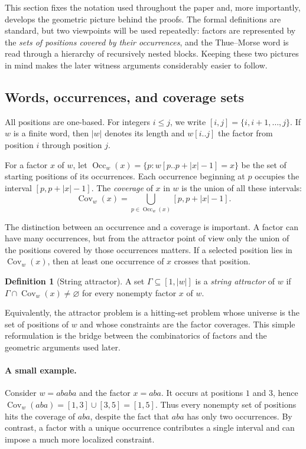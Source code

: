 \documentclass[11pt,a4paper]{article}
\theoremstyle{definition}\newtheorem{definition}[theorem]{Definition}
\theoremstyle{remark}\newtheorem{remark}[theorem]{Remark}
\newcommand{\Occ}{\operatorname{Occ}}
\newcommand{\Cov}{\operatorname{Cov}}
\begin{document}
This section fixes the notation used throughout the paper and, more importantly, develops the geometric picture behind the proofs. The formal definitions are standard, but two viewpoints will be used repeatedly: factors are represented by the \emph{sets of positions covered by their occurrences}, and the Thue--Morse word is read through a hierarchy of recursively nested blocks. Keeping these two pictures in mind makes the later witness arguments considerably easier to follow.

\subsection{Words, occurrences, and coverage sets}
All positions are one-based. For integers $i\le j$, we write
$
[i,j]=\{i,i+1,\ldots,j\}.
$
If $w$ is a finite word, then $|w|$ denotes its length and $w[i..j]$ the factor from position $i$ through position $j$.

For a factor $x$ of $w$, let
$
\Occ_w(x)=\{p:w[p..p+|x|-1]=x\}
$
be the set of starting positions of its occurrences. Each occurrence beginning at $p$ occupies the interval
$
[p,p+|x|-1].
$
The \emph{coverage} of $x$ in $w$ is the union of all these intervals:
\begin{equation}
\Cov_w(x)=\bigcup_{p\in\Occ_w(x)}[p,p+|x|-1].
\label{eq:coverage-definition}
\end{equation}

The distinction between an occurrence and a coverage is important. A factor can have many occurrences, but from the attractor point of view only the union of the positions covered by those occurrences matters. If a selected position lies in $\Cov_w(x)$, then at least one occurrence of $x$ crosses that position.

\begin{definition}[String attractor]
A set $\Gamma\subseteq[1,|w|]$ is a \emph{string attractor} of $w$ if
$
\Gamma\cap\Cov_w(x)\neq\varnothing
$
for every nonempty factor $x$ of $w$.
\end{definition}

Equivalently, the attractor problem is a hitting-set problem whose universe is the set of positions of $w$ and whose constraints are the factor coverages. This simple reformulation is the bridge between the combinatorics of factors and the geometric arguments used later.

\paragraph{A small example.}
Consider $w=ababa$ and the factor $x=aba$. It occurs at positions $1$ and $3$, hence
$
\Cov_w(aba)=[1,3]\cup[3,5]=[1,5].
$
Thus every nonempty set of positions hits the coverage of $aba$, despite the fact that $aba$ has only two occurrences. By contrast, a factor with a unique occurrence contributes a single interval and can impose a much more localized constraint.
\end{document}
